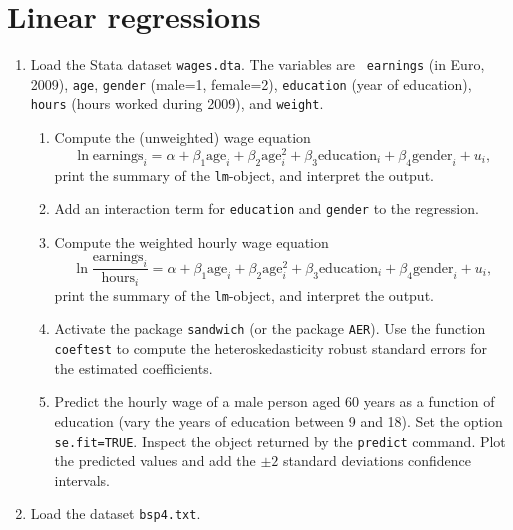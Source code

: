 \documentclass{article}
\begin{document}
\section{Linear regressions}

\begin{enumerate}
\item Load the Stata dataset \texttt{wages.dta}. The variables are \texttt{%
earnings} (in Euro, 2009), \texttt{age}, \texttt{gender} (male=1, female=2), 
\texttt{education} (year of education), \texttt{hours} (hours worked during
2009), and \texttt{weight}.

\begin{enumerate}
\item Compute the (unweighted) wage equation%
\begin{equation*}
\ln \text{earnings}_{i}=\alpha +\beta _{1}\text{age}_{i}+\beta _{2}\text{age}%
_{i}^{2}+\beta _{3}\text{education}_{i}+\beta _{4}\text{gender}_{i}+u_{i},
\end{equation*}%
print the summary of the \texttt{lm}-object, and interpret the output.

\item Add an interaction term for \texttt{education} and \texttt{gender} to
the regression.

\item Compute the weighted hourly wage equation%
\begin{equation*}
\ln \frac{\text{earnings}_{i}}{\text{hours}_{i}}=\alpha +\beta _{1}\text{age}%
_{i}+\beta _{2}\text{age}_{i}^{2}+\beta _{3}\text{education}_{i}+\beta _{4}%
\text{gender}_{i}+u_{i},
\end{equation*}%
print the summary of the \texttt{lm}-object, and interpret the output.

\item Activate the package \texttt{sandwich} (or the package \texttt{AER}).
Use the function \texttt{coeftest} to compute the heteroskedasticity robust
standard errors for the estimated coefficients.

\item Predict the hourly wage of a male person aged 60 years as a function
of education (vary the years of education between 9 and 18). Set the option 
\texttt{se.fit=TRUE}. Inspect the object returned by the \texttt{predict}
command. Plot the predicted values and add the $\pm 2$ standard deviations
confidence intervals.
\end{enumerate}

\item Load the dataset \texttt{bsp4.txt}.


\end{enumerate}
\end{document}
